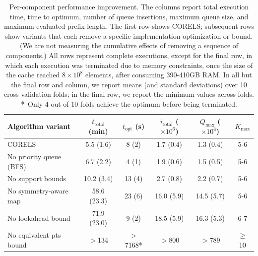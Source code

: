 \begin{table}[t!]
\centering
\begin{tabular}{l | c | c | c | c | c}
Algorithm variant & $t_\text{total}$ (min) & $t_\text{opt}$ (s) & $i_\text{total}$ ($\times 10^6$) & $Q_\text{max}$ ($\times 10^6$) & $K_\text{max}$ \\
\hline
CORELS & 5.5 (1.6) & 8 (2) & 1.7 (0.4) & 1.3 (0.4) & 5-6 \\
No priority queue (BFS) & 6.7 (2.2) & 4 (1) & 1.9 (0.6) & 1.5 (0.5) & 5-6 \\
No support bounds & 10.2 (3.4) & 13 (4) & 2.7 (0.8) & 2.2 (0.7) & 5-6 \\
No symmetry-aware map & 58.6 (23.3) & 23 (6) & 16.0 (5.9) & 14.5 (5.7) & 5-6 \\
No lookahead bound & 71.9 (23.0) & 9 (2) & 18.5 (5.9) & 16.3 (5.3) & 6-7 \\
No equivalent pts bound & $>$134 & $>$7168* & $>$800 & $>$789 & $\ge$10
\end{tabular}
\caption{Per-component performance improvement.
%
The columns report total execution time,
time to optimum, number of queue insertions,
maximum queue size, and maximum evaluated prefix length.
%
The first row shows CORELS; subsequent rows show variants
that each remove a specific implementation optimization or bound.
%
(We are not measuring the cumulative effects of removing a sequence of components.)
%
All rows represent complete executions, except for the final row,
in which each execution was terminated due to memory constraints,
once the size of the cache reached ${8 \times 10^8}$ elements,
after consuming 390-410GB RAM.
%
In all but the final row and column, we report means
(and standard deviations) over 10 cross-validation folds;
in the final row, we report the minimum values across folds. \\
%
*~Only 4 out of 10 folds achieve the optimum before being terminated.
}
\vspace{4mm}
\label{tab:ablation}
\end{table}
%
